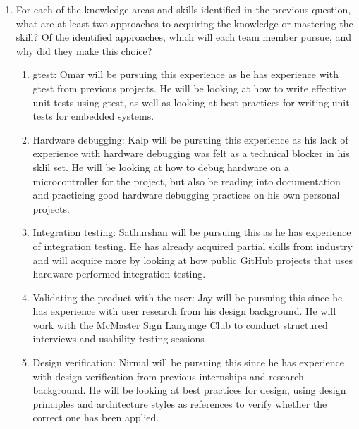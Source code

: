 \documentclass[12pt, titlepage]{article}
\begin{document}
\begin{enumerate}
  \item For each of the knowledge areas and skills identified in the previous
  question, what are at least two approaches to acquiring the knowledge or
  mastering the skill?  Of the identified approaches, which will each team
  member pursue, and why did they make this choice?

  \begin{enumerate}
    \item gtest: Omar will be pursuing this experience as he has experience
    with gtest from previous projects. He will be looking at how to write
    effective unit tests using gtest, as well as looking at best practices for
    writing unit tests for embedded systems. 
    \item Hardware debugging: Kalp will be pursuing this experience as his lack
    of experience with hardware debugging was felt as a technical blocker in 
    his sklil set. He will be looking at how to debug hardware 
    on a microcontroller for the project, but also be reading into documentation
    and practicing good hardware debugging practices on his own personal 
    projects. 
    \item Integration testing: Sathurshan will be pursuing this as he has
    experience of integration testing. He has already acquired partial skills
    from industry and will acquire more by looking at how public GitHub projects
    that uses hardware performed integration testing.
    \item Validating the product with the user: Jay will be pursuing this since he has experience 
    with user research from his design background. He will work with the McMaster Sign Language Club to 
    conduct structured interviews and usability testing sessions
    \item Design verification: Nirmal will be pursuing this since he has 
    experience with design verification from previous internships and research 
    background. He will be looking at best practices for design, using design 
    principles and architecture styles as references to verify whether the 
    correct one has been applied. 
  \end{enumerate}
\end{enumerate}
\end{document}
